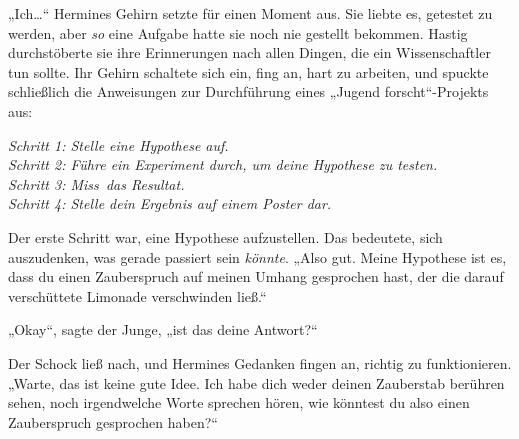 „Ich…“ Hermines Gehirn setzte für einen Moment aus. Sie liebte es, getestet zu werden, aber \emph{so} eine Aufgabe hatte sie noch nie gestellt bekommen. Hastig durchstöberte sie ihre Erinnerungen nach allen Dingen, die ein Wissenschaftler tun sollte. Ihr Gehirn schaltete sich ein, fing an, hart zu arbeiten, und spuckte schließlich die Anweisungen zur Durchführung eines „Jugend forscht“-Projekts aus:

\emph{%
Schritt 1: Stelle eine Hypothese auf.\\
Schritt 2: Führe ein Experiment durch, um deine Hypothese zu testen.\\
Schritt 3: Miss~das Resultat.\\
Schritt 4: Stelle dein Ergebnis auf einem Poster dar.%
}

Der erste Schritt war, eine Hypothese aufzustellen. Das bedeutete, sich auszudenken, was gerade passiert sein \emph{könnte}. „Also gut. Meine Hypothese ist es, dass du einen Zauberspruch auf meinen Umhang gesprochen hast, der die darauf verschüttete Limonade verschwinden ließ.“

„Okay“, sagte der Junge, „ist das deine Antwort?“

Der Schock ließ nach, und Hermines Gedanken fingen an, richtig zu funktionieren. „Warte, das ist keine gute Idee. Ich habe dich weder deinen Zauberstab berühren sehen, noch irgendwelche Worte sprechen hören, wie könntest du also einen Zauberspruch gesprochen haben?“

